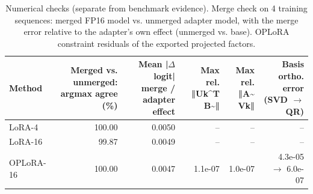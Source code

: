 \begin{table}[t]
\centering
\small
\caption{Numerical checks (separate from benchmark evidence). Merge check on 4 training sequences: merged FP16 model vs. unmerged adapter model, with the merge error relative to the adapter's own effect (unmerged vs. base). OPLoRA constraint residuals of the exported projected factors.}
\label{tab:t1-verify}
\begin{tabular}{lrrrrr}
\toprule
Method & Merged vs. unmerged: argmax agree (\%) & Mean |$\Delta$logit| merge / adapter effect & Max rel. ‖Uk\^{}T B\textasciitilde{}‖ & Max rel. ‖A\textasciitilde{} Vk‖ & Basis ortho. error (SVD $\to$ QR) \\
\midrule
LoRA-4 & 100.00 & 0.0050 & – & – & – \\
LoRA-16 & 99.87 & 0.0049 & – & – & – \\
OPLoRA-16 & 100.00 & 0.0047 & 1.1e-07 & 1.0e-07 & 4.3e-05 $\to$ 6.0e-07 \\
\bottomrule
\end{tabular}
\end{table}
